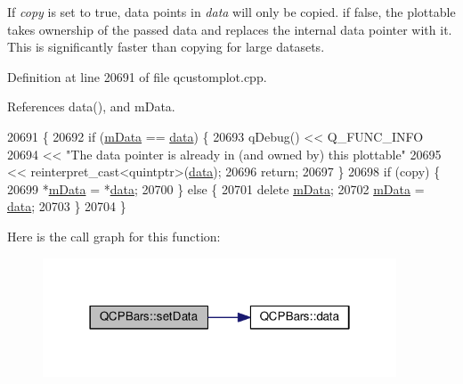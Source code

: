 If {\itshape copy} is set to true, data points in {\itshape data} will only be copied. if false, the plottable takes ownership of the passed data and replaces the internal data pointer with it. This is significantly faster than copying for large datasets. 

Definition at line 20691 of file qcustomplot.\+cpp.



References data(), and m\+Data.


\begin{DoxyCode}
20691                                                     \{
20692   \textcolor{keywordflow}{if} (\hyperlink{class_q_c_p_bars_aef28d29d51ef84b608ecd22c55d531ff}{mData} == \hyperlink{class_q_c_p_bars_ac05c21de37f677545d06fd852ef8a743}{data}) \{
20693     qDebug() << Q\_FUNC\_INFO
20694              << \textcolor{stringliteral}{"The data pointer is already in (and owned by) this plottable"}
20695              << \textcolor{keyword}{reinterpret\_cast<}quintptr\textcolor{keyword}{>}(\hyperlink{class_q_c_p_bars_ac05c21de37f677545d06fd852ef8a743}{data});
20696     \textcolor{keywordflow}{return};
20697   \}
20698   \textcolor{keywordflow}{if} (copy) \{
20699     *\hyperlink{class_q_c_p_bars_aef28d29d51ef84b608ecd22c55d531ff}{mData} = *\hyperlink{class_q_c_p_bars_ac05c21de37f677545d06fd852ef8a743}{data};
20700   \} \textcolor{keywordflow}{else} \{
20701     \textcolor{keyword}{delete} \hyperlink{class_q_c_p_bars_aef28d29d51ef84b608ecd22c55d531ff}{mData};
20702     \hyperlink{class_q_c_p_bars_aef28d29d51ef84b608ecd22c55d531ff}{mData} = \hyperlink{class_q_c_p_bars_ac05c21de37f677545d06fd852ef8a743}{data};
20703   \}
20704 \}
\end{DoxyCode}


Here is the call graph for this function\+:\nopagebreak
\begin{figure}[H]
\begin{center}
\leavevmode
\includegraphics[width=298pt]{class_q_c_p_bars_aa3435aab19e0a49e4e7b41bd36a8d96b_cgraph}
\end{center}
\end{figure}


\hypertarget{class_q_c_p_bars_a3efded5df4a82ecb201f7c28099fa2e5}{}
